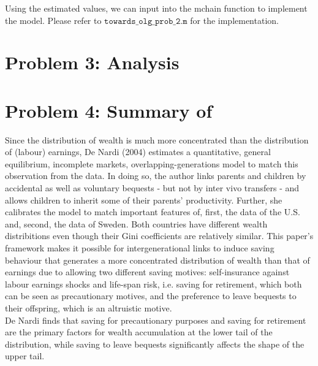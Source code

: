 \documentclass[12pt,a4paper]{article}
\begin{document}
Using the estimated values, we can input into the mchain function to implement the model. Please refer to $\texttt{towards\_olg\_prob\_2.m}$ for the implementation. 
    


    
\section*{Problem 3: Analysis}

\section*{Problem 4: Summary of \cite{de2004wealth}}
Since the distribution of wealth is much more concentrated than the distribution of (labour) earnings, De Nardi (2004) estimates a quantitative, general equilibrium, incomplete markets, overlapping-generations model to match this observation from the data. In doing so, the author links parents and children by accidental as well as voluntary bequests - but not by inter vivo transfers - and allows children to inherit some of their parents' productivity. Further, she calibrates the model to match important features of, first, the data of the U.S. and, second, the data of Sweden. Both countries have different wealth distribitions even though their Gini coefficients are relatively similar. This paper's framework makes it possible for intergenerational links to induce saving behaviour that generates a more concentrated distribution of wealth than that of earnings due to allowing two different saving motives: self-insurance against labour earnings shocks and life-span risk, i.e. saving for retirement, which both can be seen as precautionary motives, and the preference to leave bequests to their offspring, which is an altruistic motive.
\\
De Nardi finds that saving for precautionary purposes and saving for retirement are the primary factors for wealth accumulation at the lower tail of the distribution, while saving to leave bequests significantly affects the shape of the upper tail.

\pagebreak



\pagebreak


\end{document}
